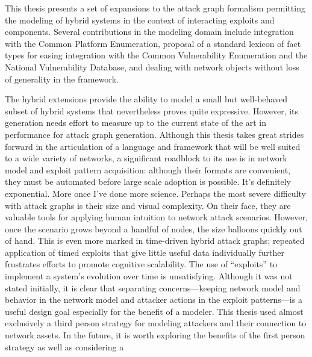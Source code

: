 This thesis presents a set of expansions to the attack graph formalism
permitting the modeling of hybrid systems in the context of interacting
exploits and components. Several contributions in the modeling domain include
integration with the Common Platform Enumeration, proposal of a standard
lexicon of fact types for easing integration with the Common Vulnerability
Enumeration and the National Vulnerability Database, and dealing with
network objects without loss of generality in the framework.

The hybrid extensions provide the ability to model a small but well-behaved
subset of hybrid systems that nevertheless proves quite expressive. However,
its generation needs effort to measure up to the current state of the art in
performance for attack graph generation.
Although this thesis takes great strides forward in the articulation of a
language and framework that will be well suited to a wide variety of networks,
a significant roadblock to its use is in network model and exploit pattern
acquisition: although their formats are convenient, they must be automated
before large scale adoption is possible.
It's definitely exponential. More once I've done more science.
Perhaps the most severe difficulty with attack graphs is their size and visual
complexity. On their face, they are valuable tools for applying human intuition
to network attack scenarios. However, once the scenario grows beyond a handful
of nodes, the size balloons quickly out of hand. This is even more marked in
time-driven hybrid attack graphs; repeated application of timed exploits that
give little useful data individually further frustrates efforts to promote
cognitive scalability.
The use of ``exploits'' to implement a system's evolution over time is
unsatisfying. Although it was not stated initially, it is
clear that separating concerns---keeping network model and behavior in the
network model and attacker actions in the exploit patterns---is a useful
design goal especially for the benefit of a modeler.
This thesis used almost exclusively a third person strategy for modeling
attackers and their connection to network assets. In the future, it is worth
exploring the benefits of the first person strategy as well as considering a
